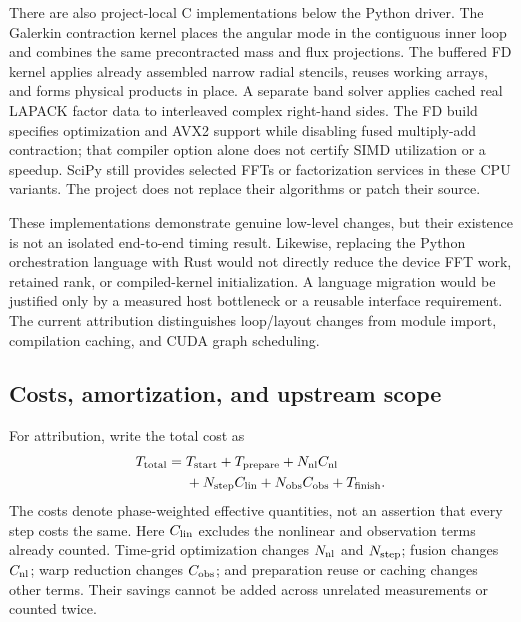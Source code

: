 There are also project-local C implementations below the Python driver. The Galerkin contraction kernel places the angular mode in the contiguous inner loop and combines the same precontracted mass and flux projections. The buffered FD kernel applies already assembled narrow radial stencils, reuses working arrays, and forms physical products in place. A separate band solver applies cached real LAPACK factor data to interleaved complex right-hand sides. The FD build specifies optimization and AVX2 support while disabling fused multiply-add contraction; that compiler option alone does not certify SIMD utilization or a speedup. SciPy still provides selected FFTs or factorization services in these CPU variants. The project does not replace their algorithms or patch their source.

These implementations demonstrate genuine low-level changes, but their existence is not an isolated end-to-end timing result. Likewise, replacing the Python orchestration language with Rust would not directly reduce the device FFT work, retained rank, or compiled-kernel initialization. A language migration would be justified only by a measured host bottleneck or a reusable interface requirement. The current attribution distinguishes loop/layout changes from module import, compilation caching, and CUDA graph scheduling.

\subsection{Costs, amortization, and upstream scope}

For attribution, write the total cost as
\begin{equation}
\label{eq:cost}
\begin{aligned}
T_{\rm total}={}&T_{\rm start}+T_{\rm prepare}+N_{\rm nl}C_{\rm nl}\\
&+N_{\rm step}C_{\rm lin}+N_{\rm obs}C_{\rm obs}+T_{\rm finish}.
\end{aligned}
\end{equation}
The costs denote phase-weighted effective quantities, not an assertion that every step costs the same. Here \(C_{\rm lin}\) excludes the nonlinear and observation terms already counted. Time-grid optimization changes \(N_{\rm nl}\) and \(N_{\rm step}\); fusion changes \(C_{\rm nl}\); warp reduction changes \(C_{\rm obs}\); and preparation reuse or caching changes other terms. Their savings cannot be added across unrelated measurements or counted twice.


